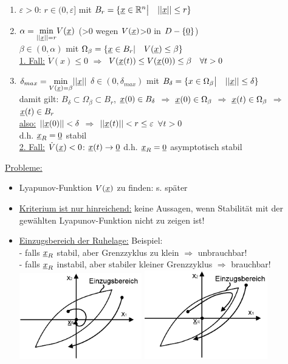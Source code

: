 \documentclass[openany,a4paper,11pt]{book}
\begin{document}
\begin{enumerate}
    \item $\varepsilon>0$: $r \in (0,\varepsilon]$ mit $B_r=\{\uline{x} \in \mathbb{R}^n\big|\quad ||\uline{x}||\le r\}$
    \item $\alpha=\underset{||\uline{x}||=r}\min V(\uline{x})$ (>0 wegen $V(\uline{x})$>0 in $D-\{\uline{0}\}$)\\
    $\beta \in (0,\alpha)$ mit $\Omega_\beta =\{\uline{x}\in B_r |\quad V(\uline{x})\le \beta\}$\\
    \uline{1. Fall:} $\dot{V}(x)\le 0$ $\Rightarrow$ $V(\uline{x}(t))\le V(\uline{x}(0)) \le \beta \quad \forall t>0$
    \item $\delta_{max}=\underset{V(\uline{x})=\beta}\min||\uline{x}||$ \quad $\delta \in (0,\delta_{max})$ mit $B_{\delta}= \{ x \in \Omega_\beta \big| \quad ||\uline{x}||\le \delta \} $\\
    damit gilt: $B_\delta \subset \Omega_\beta \subset B_r$, $\uline{x}(0)\in B_\delta$ $\Rightarrow$ $\uline{x}(0)\in \Omega_\beta$ $\Rightarrow$ $\uline{x}(t)\in \Omega_\beta$ $\Rightarrow$ $\uline{x}(t)\in B_r$\\
    \uline{also:} $||\uline{x}(0)||<\delta$ $\Rightarrow$ $||\uline{x}(t)||<r\le \varepsilon$ \quad $\forall t>0$ \\
    d.h. $\uline{x}_R=\uline{0}$ stabil\\
    \uline{2. Fall:} $\dot{V}(\uline{x})<0$: $\uline{x}(t) \rightarrow \uline{0}$ d.h. $\uline{x}_R=\uline{0}$ asymptotisch stabil
\end{enumerate}
\uline{Probleme:}\begin{itemize}
    \item Lyapunov-Funktion $V(\uline{x})$ zu finden: s. später
    \item \uline{Kriterium ist nur hinreichend:} keine Aussagen, wenn Stabilität mit der gewählten Lyapunov-Funktion nicht zu zeigen ist!
    \item \uline{Einzugsbereich der Ruhelage:} Beispiel:\\
    - falls $\uline{x}_R$ stabil, aber Grenzzyklus zu klein $\Rightarrow$ unbrauchbar!\\
    - falls $\uline{x}_R$ instabil, aber stabiler kleiner Grenzzyklus $\Rightarrow$ brauchbar!\\
    \includegraphics[width=2.1in]{imgs/NLR39.png} \includegraphics[width=2.1in]{imgs/NLR40.png}
\end{itemize}
\end{document}
